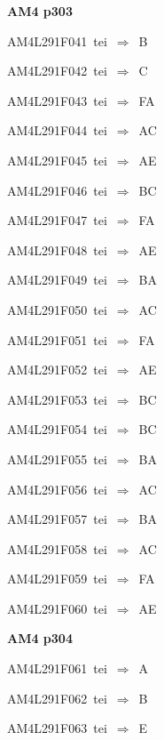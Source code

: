 \par\vfill\eject
{\bf\hfill AM4 p303\hfill\hbox{}}\par\bigskip
{\sixrm AM4L291F041\ {\sixit tei}\ }$\Rightarrow$\ {\tenit B}\par\smallskip
{\sixrm AM4L291F042\ {\sixit tei}\ }$\Rightarrow$\ {\tenit C}\par\smallskip
{\sixrm AM4L291F043\ {\sixit tei}\ }$\Rightarrow$\ FA\par\smallskip
{\sixrm AM4L291F044\ {\sixit tei}\ }$\Rightarrow$\ AC\par\smallskip
{\sixrm AM4L291F045\ {\sixit tei}\ }$\Rightarrow$\ AE\par\smallskip
{\sixrm AM4L291F046\ {\sixit tei}\ }$\Rightarrow$\ BC\par\smallskip
{\sixrm AM4L291F047\ {\sixit tei}\ }$\Rightarrow$\ FA\par\smallskip
{\sixrm AM4L291F048\ {\sixit tei}\ }$\Rightarrow$\ AE\par\smallskip
{\sixrm AM4L291F049\ {\sixit tei}\ }$\Rightarrow$\ BA\par\smallskip
{\sixrm AM4L291F050\ {\sixit tei}\ }$\Rightarrow$\ AC\par\smallskip
{\sixrm AM4L291F051\ {\sixit tei}\ }$\Rightarrow$\ FA\par\smallskip
{\sixrm AM4L291F052\ {\sixit tei}\ }$\Rightarrow$\ AE\par\smallskip
{\sixrm AM4L291F053\ {\sixit tei}\ }$\Rightarrow$\ BC\par\smallskip
{\sixrm AM4L291F054\ {\sixit tei}\ }$\Rightarrow$\ BC\par\smallskip
{\sixrm AM4L291F055\ {\sixit tei}\ }$\Rightarrow$\ BA\par\smallskip
{\sixrm AM4L291F056\ {\sixit tei}\ }$\Rightarrow$\ AC\par\smallskip
{\sixrm AM4L291F057\ {\sixit tei}\ }$\Rightarrow$\ BA\par\smallskip
{\sixrm AM4L291F058\ {\sixit tei}\ }$\Rightarrow$\ AC\par\smallskip
{\sixrm AM4L291F059\ {\sixit tei}\ }$\Rightarrow$\ FA\par\smallskip
{\sixrm AM4L291F060\ {\sixit tei}\ }$\Rightarrow$\ AE\par\smallskip

\par\vfill\eject
{\bf\hfill AM4 p304\hfill\hbox{}}\par\bigskip
{\sixrm AM4L291F061\ {\sixit tei}\ }$\Rightarrow$\ {\tenit A}\par\smallskip
{\sixrm AM4L291F062\ {\sixit tei}\ }$\Rightarrow$\ {\tenit B}\par\smallskip
{\sixrm AM4L291F063\ {\sixit tei}\ }$\Rightarrow$\ {\tenit E}\par\smallskip

